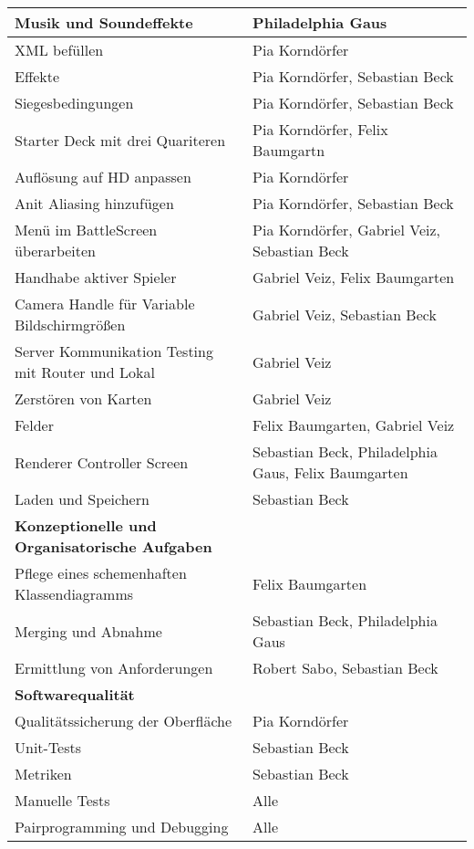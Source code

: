 \begin{longtable}{|p{8cm}|p{10cm}|}
Musik und Soundeffekte & Philadelphia Gaus \\ \hline
XML befüllen & Pia Korndörfer \\ \hline
Effekte & Pia Korndörfer, Sebastian Beck \\ \hline
Siegesbedingungen & Pia Korndörfer, Sebastian Beck \\ \hline
Starter Deck mit drei Quariteren & Pia Korndörfer, Felix Baumgartn \\ \hline
Auflösung auf HD anpassen & Pia Korndörfer \\ \hline
Anit Aliasing hinzufügen & Pia Korndörfer, Sebastian Beck \\ \hline
Menü im BattleScreen überarbeiten & Pia Korndörfer, Gabriel Veiz, Sebastian Beck \\ \hline
Handhabe aktiver Spieler & Gabriel Veiz, Felix Baumgarten \\ \hline
Camera Handle für Variable Bildschirmgrößen & Gabriel Veiz, Sebastian Beck \\ \hline
Server Kommunikation Testing mit Router und Lokal & Gabriel Veiz \\ \hline
Zerstören von Karten & Gabriel Veiz \\ \hline
Felder & Felix Baumgarten, Gabriel Veiz \\ \hline
Renderer Controller Screen & Sebastian Beck, Philadelphia Gaus, Felix Baumgarten \\ \hline
Laden und Speichern & Sebastian Beck \\ \hline
\textbf{Konzeptionelle und Organisatorische Aufgaben} & \\ \hline
Pflege eines schemenhaften Klassendiagramms  & Felix Baumgarten \\ \hline
Merging und Abnahme  & Sebastian Beck, Philadelphia Gaus \\ \hline
Ermittlung von Anforderungen & Robert Sabo, Sebastian Beck \\ \hline
\textbf{Softwarequalität} & \\ \hline
Qualitätssicherung der Oberfläche & Pia Korndörfer \\ \hline
Unit-Tests & Sebastian Beck \\ \hline
Metriken & Sebastian Beck \\ \hline
Manuelle Tests & Alle \\ \hline
Pairprogramming und Debugging & Alle \\ \hline
\end{longtable}